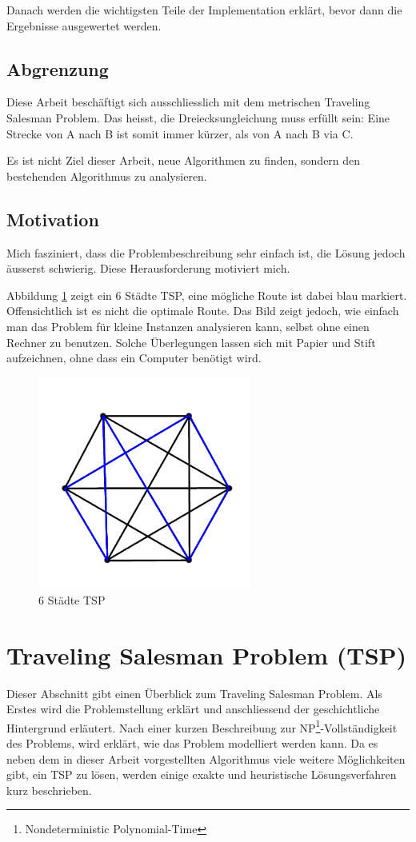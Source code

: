 \documentclass[11pt,a4paper]{article}
\begin{document}
Danach werden die wichtigsten Teile der Implementation erklärt, bevor dann die Ergebnisse ausgewertet werden. 

\subsection{Abgrenzung}
Diese Arbeit beschäftigt sich ausschliesslich mit dem metrischen Traveling Salesman Problem. Das heisst, die Dreiecksungleichung muss erfüllt sein: Eine Strecke von A nach B ist somit immer kürzer, als von A nach B via C. 

Es ist nicht Ziel dieser Arbeit, neue Algorithmen zu finden, sondern den bestehenden Algorithmus zu analysieren.

\subsection{Motivation}
Mich fasziniert, dass die Problembeschreibung sehr einfach ist, die Lösung jedoch äusserst schwierig. Diese Herausforderung motiviert mich.

Abbildung \ref{img:simple_tsp} zeigt ein 6 Städte TSP, eine mögliche Route ist dabei blau markiert. Offensichtlich ist es nicht die optimale Route. Das Bild zeigt jedoch, wie einfach man das Problem für kleine Instanzen analysieren kann, selbst ohne einen Rechner zu benutzen. Solche Überlegungen lassen sich mit Papier und Stift aufzeichnen, ohne dass ein Computer benötigt wird. 

\begin{figure}[H]
        \centering
        \includegraphics[width=7cm]{gfx/simple_tsp}
        \caption{6 Städte TSP}
        \label{img:simple_tsp}
\end{figure}

\newpage
\section{Traveling Salesman Problem (TSP)}
\label{s:traveling_salesman_problem}
Dieser Abschnitt gibt einen Überblick zum Traveling Salesman Problem. Als Erstes wird die Problemstellung erklärt und anschliessend der geschichtliche Hintergrund erläutert. Nach einer kurzen Beschreibung zur NP\footnote{Nondeterministic Polynomial-Time}-Vollständigkeit des Problems, wird erklärt, wie das Problem modelliert werden kann. Da es neben dem in dieser Arbeit vorgestellten Algorithmus viele weitere Möglichkeiten gibt, ein TSP zu lösen, werden einige exakte und heuristische Lösungsverfahren kurz beschrieben.
\end{document}

